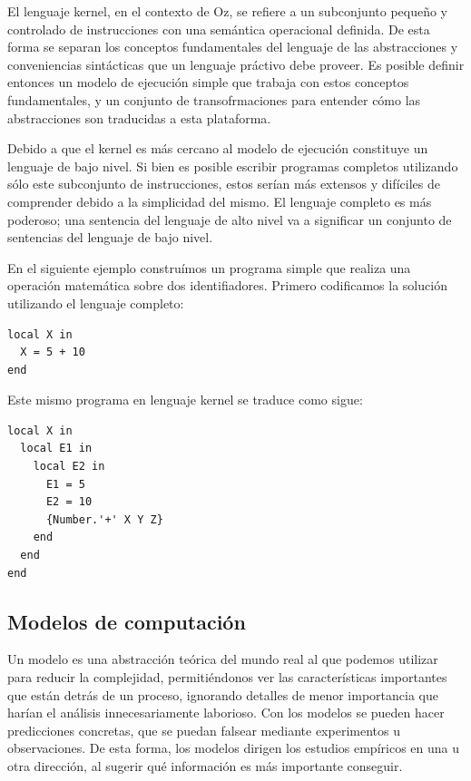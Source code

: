 \documentclass[a4paper,11pt]{article}
\begin{document}
El lenguaje kernel, en el contexto de Oz, se refiere a un subconjunto pequeño y controlado de instrucciones con una semántica operacional definida. De esta forma se separan los conceptos fundamentales del lenguaje de las abstracciones y conveniencias sintácticas que un lenguaje práctivo debe proveer. Es posible definir entonces un modelo de ejecución simple que trabaja con estos conceptos fundamentales, y un conjunto de transofrmaciones para entender cómo las abstracciones son traducidas a esta plataforma.

Debido a que el kernel es más cercano al modelo de ejecución constituye un lenguaje de bajo nivel. Si bien es posible escribir programas completos utilizando sólo este subconjunto de instrucciones, estos serían más extensos y difíciles de comprender debido a la simplicidad del mismo. El lenguaje completo es más poderoso; una sentencia del lenguaje de alto nivel va a significar un conjunto de sentencias del lenguaje de bajo nivel.

En el siguiente ejemplo construímos un programa simple que realiza una operación matemática sobre dos identifiadores. Primero codificamos la solución utilizando el lenguaje completo:

\begin{lstlisting}[language=oz]
local X in
  X = 5 + 10
end
\end{lstlisting}

Este mismo programa en lenguaje kernel se traduce como sigue:

\begin{lstlisting}[language=oz]
local X in
  local E1 in
    local E2 in
      E1 = 5
      E2 = 10
      {Number.'+' X Y Z}
    end
  end
end
\end{lstlisting}


\subsection{Modelos de computación}

Un modelo es una abstracción teórica del mundo real al que podemos utilizar para reducir la complejidad, permitiéndonos ver las características importantes que están detrás de un proceso, ignorando detalles de menor importancia que harían el análisis innecesariamente laborioso.
Con los modelos se pueden hacer predicciones concretas, que se puedan falsear mediante experimentos u observaciones. De esta forma, los modelos dirigen los estudios empíricos en una u otra dirección, al sugerir qué información es más importante conseguir.
\end{document}
